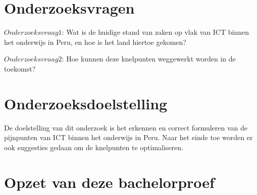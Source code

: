 
\section{Onderzoeksvragen}
\label{sec:onderzoeksvraag}


$Onderzoeksvraag 1$: Wat is de huidige stand van zaken op vlak van ICT binnen het onderwijs in Peru, en hoe is het land hiertoe gekomen?

$Onderzoeksvraag 2$: Hoe kunnen deze knelpunten weggewerkt worden in de toekomst?

\section{Onderzoeksdoelstelling}
\label{sec:onderzoeksdoelstelling}


De doelstelling van dit onderzoek is het erkennen en correct formuleren van de pijnpunten van ICT binnen het onderwijs in Peru. Naar het einde toe worden er ook suggesties gedaan om de knelpunten te optimaliseren.

\section{Opzet van deze bachelorproef}
\label{sec:opzet-bachelorproef}

